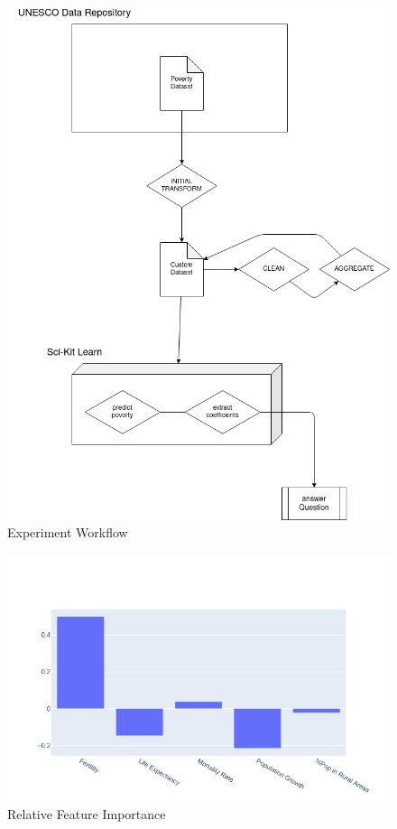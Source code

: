 \documentclass[12pt]{article}
\begin{document}
\begin{figure}[h]
    \includegraphics[scale=0.5]{DS1.png}
    \caption{Experiment Workflow}
\end{figure}

\begin{figure}[h]
    \includegraphics[scale=0.65]{feature_importances.png}
    \caption{Relative Feature Importance}
\end{figure}
\end{document}
